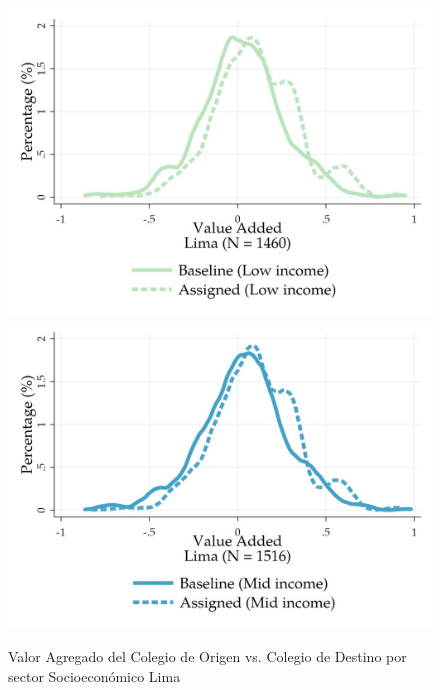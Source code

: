\documentclass[11pt]{article}
\numberwithin{equation}{section}
\begin{document}
\begin{figure}[!htb]
\caption{Valor Agregado del Colegio de Origen vs. Colegio de Destino por sector Socioecon\'omico \newline Lima}
    \begin{minipage}[b]{0.99\textwidth}
            \includegraphics[width=\linewidth]{figures/LimaLI.jpeg}
            \label{fig:LimaLI}
        \endminipage
        \hfill
            \includegraphics[width=\linewidth]{figures/LimaMI.jpeg}
            \label{fig:LimaMI}
        \endminipage
        \hfill

\end{minipage}
\end{figure}
\end{document}
